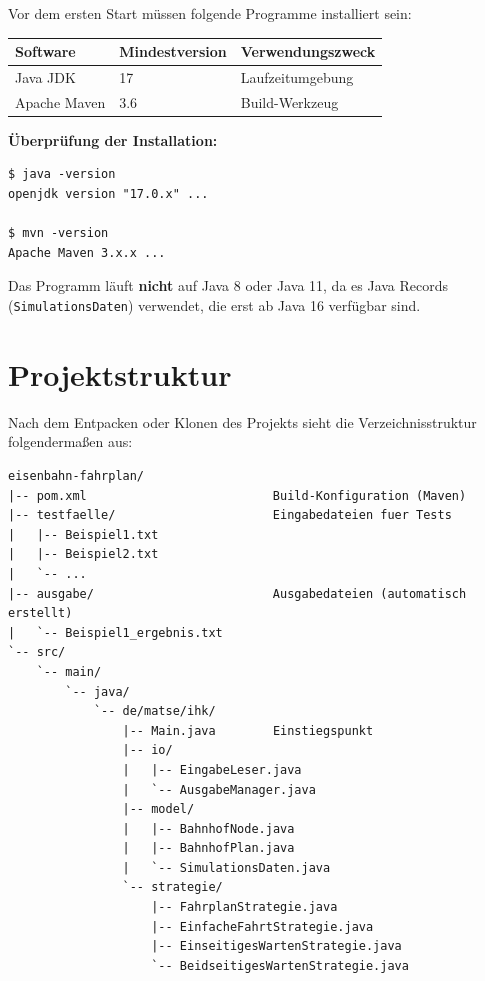 \documentclass[12pt,a4paper]{article}
\begin{document}
Vor dem ersten Start müssen folgende Programme installiert sein:

\begin{center}
\begin{tabular}{lll}
\toprule
\textbf{Software} & \textbf{Mindestversion} & \textbf{Verwendungszweck} \\
\midrule
Java JDK & 17 & Laufzeitumgebung \\
Apache Maven & 3.6 & Build-Werkzeug \\
\bottomrule
\end{tabular}
\end{center}

\textbf{Überprüfung der Installation:}

\begin{lstlisting}[style=terminal]
$ java -version
openjdk version "17.0.x" ...

$ mvn -version
Apache Maven 3.x.x ...
\end{lstlisting}

\begin{warnung}
Das Programm läuft \textbf{nicht} auf Java 8 oder Java 11, da es Java Records (\texttt{SimulationsDaten}) verwendet, die erst ab Java 16 verfügbar sind.
\end{warnung}

\section{Projektstruktur}

Nach dem Entpacken oder Klonen des Projekts sieht die Verzeichnisstruktur folgendermaßen aus:

\begin{lstlisting}
eisenbahn-fahrplan/
|-- pom.xml                          Build-Konfiguration (Maven)
|-- testfaelle/                      Eingabedateien fuer Tests
|   |-- Beispiel1.txt
|   |-- Beispiel2.txt
|   `-- ...
|-- ausgabe/                         Ausgabedateien (automatisch erstellt)
|   `-- Beispiel1_ergebnis.txt
`-- src/
    `-- main/
        `-- java/
            `-- de/matse/ihk/
                |-- Main.java        Einstiegspunkt
                |-- io/
                |   |-- EingabeLeser.java
                |   `-- AusgabeManager.java
                |-- model/
                |   |-- BahnhofNode.java
                |   |-- BahnhofPlan.java
                |   `-- SimulationsDaten.java
                `-- strategie/
                    |-- FahrplanStrategie.java
                    |-- EinfacheFahrtStrategie.java
                    |-- EinseitigesWartenStrategie.java
                    `-- BeidseitigesWartenStrategie.java
\end{lstlisting}
\end{document}
